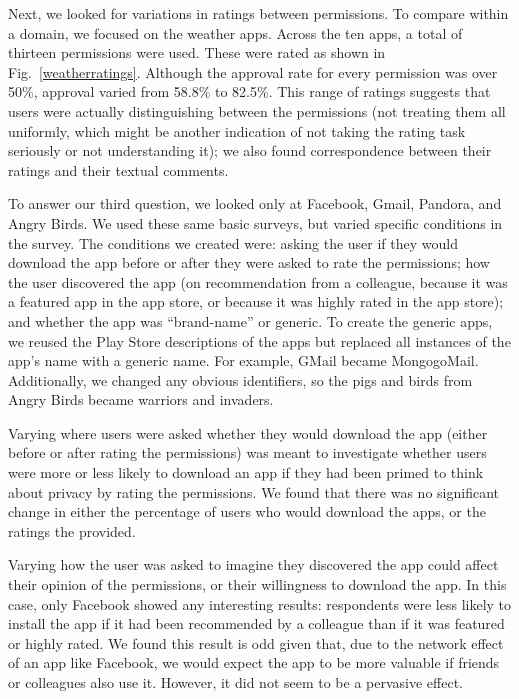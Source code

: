 \documentclass[11pt]{article}
\begin{document}
Next, we looked for variations in ratings between permissions. To
compare within a domain, we focused on the weather apps. Across the
ten apps, a total of thirteen permissions were used. These were rated
as shown in Fig.~\ref{weatherratings}.  Although the approval rate for
every permission was over 50\%, approval varied from 58.8\% to
82.5\%. This range of ratings suggests that users were actually
distinguishing between the permissions (not treating them all
uniformly, which might be another indication of not taking the rating
task seriously or not understanding it); we also found correspondence
between their ratings and their textual comments.

To answer our third question, we looked only at Facebook, Gmail,
Pandora, and Angry Birds.  We used these same basic surveys, but
varied specific conditions in the survey. The conditions we created
were: asking the user if they would download the app before or after
they were asked to rate the permissions; how the user discovered the
app (on recommendation from a colleague, because it was a featured app in
the app store, or because it was highly rated in the app store); and
whether the app was ``brand-name'' or generic. To create the generic
apps, we reused the Play Store descriptions of the apps but replaced all
instances of the app's name with a generic name. For example, GMail
became MongogoMail.  Additionally, we changed any obvious identifiers,
so the pigs and birds from Angry Birds became warriors and invaders.

Varying where users were asked whether they would download the app (either before or after rating the permissions) was
meant to investigate whether users were more or less likely to
download an app if they had been primed to think about privacy by
rating the permissions. We found that there was no significant change
in either the percentage of users who would download the apps, or the
ratings the provided.

Varying how the user was asked to imagine they discovered the app
could affect their opinion of the permissions, or their willingness to
download the app. In this case, only Facebook showed any interesting
results: respondents were less likely to install the app if it
had been recommended by a colleague than if it was featured or highly
rated. We found this result is odd given that, due to the network
effect of an app like Facebook, we would expect the app to be more
valuable if friends or colleagues also use it. However, it did not
seem to be a pervasive effect.
\end{document}
